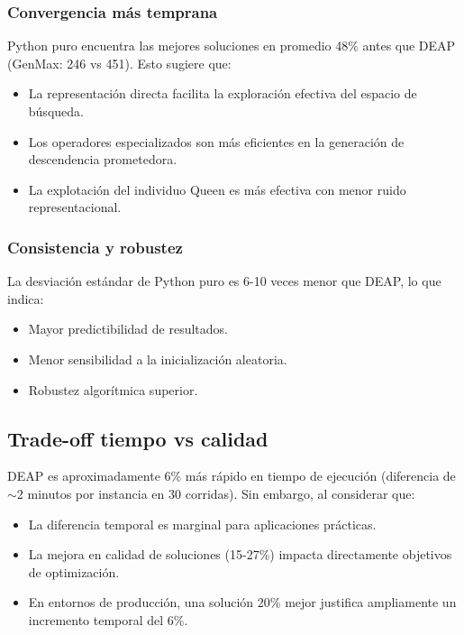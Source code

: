 \documentclass[12pt,a4paper]{article}
\begin{document}
\subsubsection{Convergencia más temprana}

Python puro encuentra las mejores soluciones en promedio 48\% antes que DEAP (GenMax: 246 vs 451). Esto sugiere que:

\begin{itemize}
    \item La representación directa facilita la exploración efectiva del espacio de búsqueda.
    \item Los operadores especializados son más eficientes en la generación de descendencia prometedora.
    \item La explotación del individuo Queen es más efectiva con menor ruido representacional.
\end{itemize}

\subsubsection{Consistencia y robustez}

La desviación estándar de Python puro es 6-10 veces menor que DEAP, lo que indica:

\begin{itemize}
    \item Mayor predictibilidad de resultados.
    \item Menor sensibilidad a la inicialización aleatoria.
    \item Robustez algorítmica superior.
\end{itemize}

\subsection{Trade-off tiempo vs calidad}

DEAP es aproximadamente 6\% más rápido en tiempo de ejecución (diferencia de $\sim$2 minutos por instancia en 30 corridas). Sin embargo, al considerar que:

\begin{itemize}
    \item La diferencia temporal es marginal para aplicaciones prácticas.
    \item La mejora en calidad de soluciones (15-27\%) impacta directamente objetivos de optimización.
    \item En entornos de producción, una solución 20\% mejor justifica ampliamente un incremento temporal del 6\%.
\end{itemize}
\end{document}
